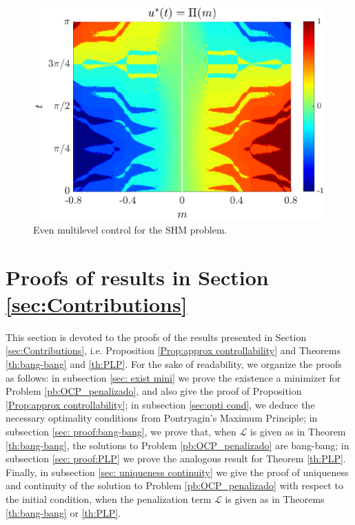 \documentclass[9pt,shortpaper,twoside,web]{ieeecolor}
\begin{document}


\begin{figure}[ht!]
	\hspace{0.25em}
	\includegraphics[scale=0.5]{img/fig10.eps}
	\caption{Even multilevel control for the SHM problem.}\label{fig:sim-multi-level-par}
\end{figure} 

\section{Proofs of results in Section \ref{sec:Contributions}}\label{sec:Proof}

This section is devoted to the proofs of the results presented in Section \ref{sec:Contributions}, i.e. Proposition \ref{Prop:approx controllability} and Theorems \ref{th:bang-bang} and \ref{th:PLP}. For the sake of readability, we organize the proofs as follows: in subsection \ref{sec: exist mini} we prove the existence a minimizer for Problem \ref{pb:OCP_penalizado}, and also give the proof of Proposition \ref{Prop:approx controllability}; in subsection \ref{sec:opti cond}, we deduce the necessary optimality conditions from Pontryagin's Maximum Principle; in subsection \ref{sec: proof:bang-bang}, we prove that, when $\mathcal{L}$ is given as in Theorem \ref{th:bang-bang}, the solutions to Problem \ref{pb:OCP_penalizado} are bang-bang; in subsection \ref{sec: proof:PLP} we prove the analogous result for Theorem \ref{th:PLP}. Finally, in subsection \ref{sec: uniqueness continuity} we give the proof of uniqueness and continuity of the solution to Problem \ref{pb:OCP_penalizado} with respect to the initial condition, when the penalization term $\mathcal{L}$ is given as in Theorems \ref{th:bang-bang} or \ref{th:PLP}.
\end{document}
